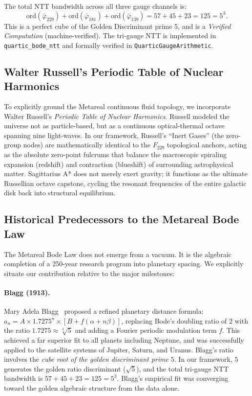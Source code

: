 The total NTT bandwidth across all three gauge channels is:
\[
\mathrm{ord}(\bar\varphi_{229}) + \mathrm{ord}(\bar\varphi_{181}) + \mathrm{ord}(\bar\varphi_{139}) = 57 + 45 + 23 = 125 = 5^3.
\]
This is a perfect cube of the Golden Discriminant prime 5, and is a \emph{Verified Computation} (machine-verified). The tri-gauge NTT is implemented in \texttt{quartic\_bode\_ntt} and formally verified in \texttt{QuarticGaugeArithmetic}.

\subsection{Walter Russell's Periodic Table of Nuclear Harmonics}
To explicitly ground the Metareal continuous fluid topology, we incorporate Walter Russell's \emph{Periodic Table of Nuclear Harmonics}. Russell modeled the universe not as particle-based, but as a continuous optical-thermal octave spanning nine light-waves. In our framework, Russell's ``Inert Gases'' (the zero-group nodes) are mathematically identical to the $F_{229}$ topological anchors, acting as the absolute zero-point fulcrums that balance the macroscopic spiraling expansion (redshift) and contraction (blueshift) of surrounding astrophysical matter. Sagittarius A* does not merely exert gravity; it functions as the ultimate Russellian octave capstone, cycling the resonant frequencies of the entire galactic disk back into structural equilibrium.

\subsection{Historical Predecessors to the Metareal Bode Law}
The Metareal Bode Law does not emerge from a vacuum. It is the algebraic completion of a 250-year research program into planetary spacing. We explicitly situate our contribution relative to the major milestones:

\paragraph{Blagg (1913).}
Mary Adela Blagg~\cite{blagg1913} proposed a refined planetary distance formula: $a_n = A \times 1.7275^n \times [B + f(\alpha + n\beta)]$, replacing Bode's doubling ratio of $2$ with the ratio $1.7275 \approx \sqrt[3]{5}$ and adding a Fourier periodic modulation term $f$. This achieved a far superior fit to all planets including Neptune, and was successfully applied to the satellite systems of Jupiter, Saturn, and Uranus. Blagg's ratio involves the \emph{cube root of the golden discriminant prime} $5$. In our framework, $5$ generates the golden ratio discriminant ($\sqrt{5}$), and the total tri-gauge NTT bandwidth is $57 + 45 + 23 = 125 = 5^3$. Blagg's empirical fit was converging toward the golden algebraic structure from the data alone.

